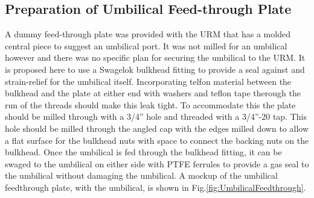 \documentclass[11pt]{article}
\begin{document}


\subsection{Preparation of Umbilical Feed-through Plate}\label{ss:umbPrepFeed}

A dummy feed-through plate was provided with the URM that has a molded
central piece to suggest an umbilical port. It was not milled for an
umbilical however and there was no specific plan for securing the
umbilical to the URM. It is proposed here to use a Swagelok bulkhead
fitting to provide a seal against and strain-relief for the umbilical
itself. Incorporating telfon material between the bulkhead and the
plate at either end with washers and teflon tape therough the run of
the threads should make this leak tight. To accommodate this the plate
should be milled through with a 3/4'' hole and threaded with a
3/4''-20 tap. This hole should be milled through the angled cap with
the edges milled down to allow a flat surface for the bulkhead nuts
with space to connect the backing nuts on the bulkhead.  Once the
umbilical is fed through the bulkhead fitting, it can be swaged to the
umbilical on either side with PTFE ferrules to provide a gas seal to
the umbilical without damaging the umbilical. A mockup of the
umbilical feedthrough plate, with the umbilical, is shown in
Fig.\ref{fig:UmbilicalFeedthrough}. 
\end{document}
